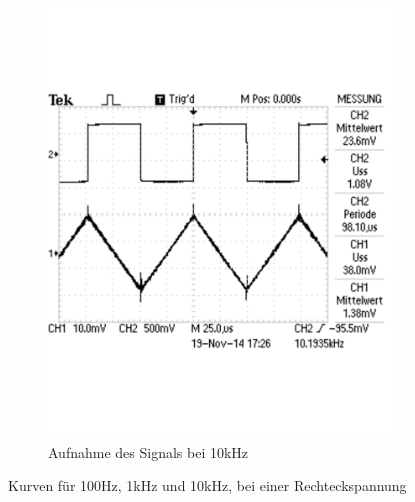 \documentclass[12pt,a4paper]{article}
\begin{document}
\begin{figure}[H]
\begin{subfigure}[b]{0.28\textwidth}
                \includegraphics[width=\textwidth , scale = 0.4]{2_6_recht_10k.pdf}
                \caption[Aufnahme des Signals bei 10kHz]{Aufnahme des Signals bei 10kHz}
  				\label{fig:2_6_recht_10k}
        \end{subfigure}
        \caption{Kurven für 100Hz, 1kHz und 10kHz, bei einer Rechteckspannung}
        \label{fig:2_6_recht}
\end{figure}
\end{document}
